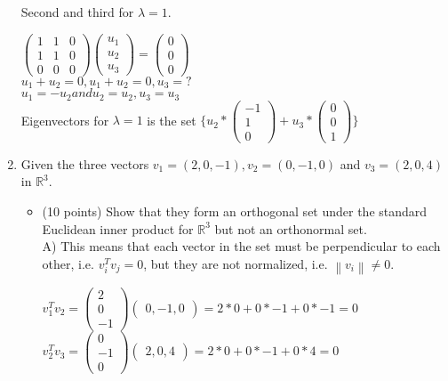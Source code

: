 \documentclass[11pt]{article}
\begin{document}
\begin{enumerate}
\begin{center}
\end{center}
Second and third for $\lambda = 1$.
\begin{center}
      $\begin{pmatrix} 1 & 1 & 0 \\ 1 & 1 & 0\\ 0 & 0 & 0 \end{pmatrix}  \begin{pmatrix} u_1  \\ u_2 \\ u_3 \end{pmatrix}= \begin{pmatrix} 0  \\ 0 \\ 0 \end{pmatrix}$\\
      $u_1 + u_2 = 0, u_1+u_2 = 0, u_3 = ?$\\
      $u_1 = -u_2 and u_2 = u_2 , u_3 = u_3$\\
      Eigenvectors for $\lambda = 1$ is the set $\{ u_2*\begin{pmatrix} -1  \\ 1 \\ 0 \end{pmatrix} + u_3 *\begin{pmatrix} 0 \\ 0 \\ 1 \end{pmatrix} \}$
\end{center}
\item Given the three vectors $v_1 = (2, 0, -1), v_2 = (0, -1, 0)$ and $v_3 = (2, 0, 4)$ in $\mathbb R^3$.
\begin{itemize}
\item (10 points) Show that they form an orthogonal set under the standard 
      Euclidean inner product for $\mathbb R^3$ but not an orthonormal set. \\
      A) This means that each vector in the set must be perpendicular to each other, 
      i.e. $v_i^Tv_j = 0$, but they are not normalized, i.e. $\left\lVert v_i \right\rVert  \neq 0$.
      \begin{center}
            $v_1^Tv_2 = \begin{pmatrix} 2  \\ 0 \\ -1 \end{pmatrix} \begin{pmatrix} 0 , -1, 0 \end{pmatrix} = 2*0 + 0*-1 + 0*-1 = 0$
            $v_2^Tv_3 = \begin{pmatrix} 0  \\ -1 \\ 0 \end{pmatrix} \begin{pmatrix} 2 , 0, 4 \end{pmatrix} = 2*0 + 0*-1 + 0*4 = 0$

\end{center}
\end{itemize}
\end{enumerate}
\end{document}

